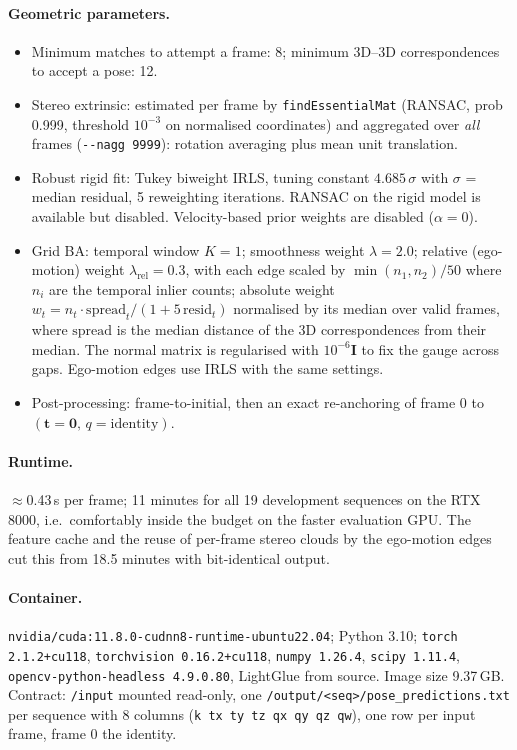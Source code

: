 \paragraph{Geometric parameters.}
\begin{itemize}\itemsep1pt
  \item Minimum matches to attempt a frame: 8; minimum 3D--3D correspondences to accept a pose: 12.
  \item Stereo extrinsic: estimated per frame by \texttt{findEssentialMat} (RANSAC, prob 0.999,
        threshold $10^{-3}$ on normalised coordinates) and aggregated over \emph{all} frames
        (\texttt{-{}-nagg 9999}): rotation averaging plus mean unit translation.
  \item Robust rigid fit: Tukey biweight IRLS, tuning constant $4.685\,\sigma$ with
        $\sigma$ = median residual, 5 reweighting iterations. RANSAC on the rigid model is available but
        disabled. Velocity-based prior weights are disabled ($\alpha = 0$).
  \item Grid BA: temporal window $K=1$; smoothness weight $\lambda = 2.0$; relative (ego-motion) weight
        $\lambda_{\mathrm{rel}} = 0.3$, with each edge scaled by $\min(n_1,n_2)/50$ where $n_i$ are the
        temporal inlier counts; absolute weight $w_t = n_t \cdot \mathrm{spread}_t / (1 + 5\,\mathrm{resid}_t)$
        normalised by its median over valid frames, where $\mathrm{spread}$ is the median distance of the
        3D correspondences from their median. The normal matrix is regularised with $10^{-6}\mathbf{I}$
        to fix the gauge across gaps. Ego-motion edges use IRLS with the same settings.
  \item Post-processing: frame-to-initial, then an exact re-anchoring of frame 0 to
        $(\mathbf{t}=\mathbf{0},\,q=\mathrm{identity})$.
\end{itemize}

\paragraph{Runtime.} $\approx$0.43\,s per frame; 11 minutes for all 19 development sequences on the
RTX 8000, i.e.\ comfortably inside the budget on the faster evaluation GPU. The feature cache and the
reuse of per-frame stereo clouds by the ego-motion edges cut this from 18.5 minutes with bit-identical
output.

\paragraph{Container.} \texttt{nvidia/cuda:11.8.0-cudnn8-runtime-ubuntu22.04}; Python 3.10;
\texttt{torch 2.1.2+cu118}, \texttt{torchvision 0.16.2+cu118}, \texttt{numpy 1.26.4},
\texttt{scipy 1.11.4}, \texttt{opencv-python-headless 4.9.0.80}, LightGlue from source. Image size
9.37\,GB. Contract: \texttt{/input} mounted read-only, one
\texttt{/output/<seq>/pose\_predictions.txt} per sequence with 8 columns
(\texttt{k tx ty tz qx qy qz qw}), one row per input frame, frame 0 the identity.

